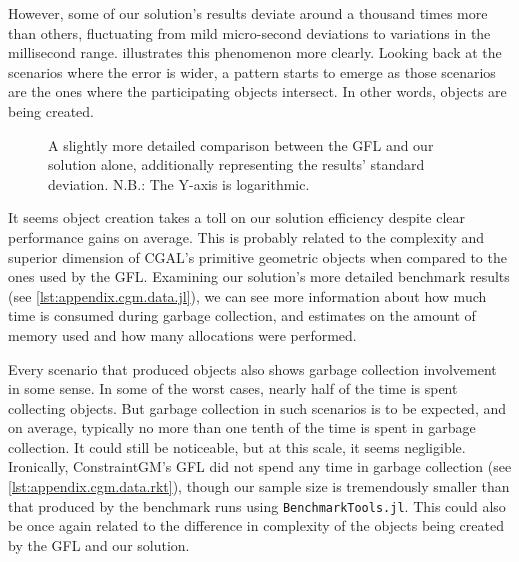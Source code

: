However, some of our solution's results deviate around a thousand times more
than others, fluctuating from mild micro-second deviations to variations in the
millisecond range.   illustrates this phenomenon more
clearly.  Looking back at the scenarios where the error is wider, a pattern
starts to emerge as those scenarios are the ones where the participating objects
intersect.  In other words, objects are being created.

\begin{figure}[htb]
  \centering
  \caption[ConstraintGM's GFL vs. Our solution]{\label{fig:eval.cgm.perferr}%
    A slightly more detailed comparison between the \ac{GFL} and our solution
    alone, additionally representing the results' standard deviation.  N.B.:
    The Y-axis is logarithmic.}
\end{figure}

It seems object creation takes a toll on our solution efficiency despite clear
performance gains on average.  This is probably related to the complexity and
superior dimension of \ac{CGAL}'s primitive geometric objects when compared to
the ones used by the \ac{GFL}.  Examining our solution's more detailed benchmark
results (see \cref{lst:appendix.cgm.data.jl}), we can see more information about
how much time is consumed during garbage collection, and estimates on the amount
of memory used and how many allocations were performed.

Every scenario that produced objects also shows garbage collection involvement
in some sense.  In some of the worst cases, nearly half of the time is spent
collecting objects.  But garbage collection in such scenarios is to be expected,
and on average, typically no more than one tenth of the time is spent in garbage
collection.  It could still be noticeable, but at this scale, it seems
negligible.  Ironically, ConstraintGM's \ac{GFL} did not spend any time in
garbage collection (see \cref{lst:appendix.cgm.data.rkt}), though our sample size
is tremendously smaller than that produced by the benchmark runs using
\texttt{BenchmarkTools.jl}.  This could also be once again related to the
difference in complexity of the objects being created by the \ac{GFL} and our
solution.

